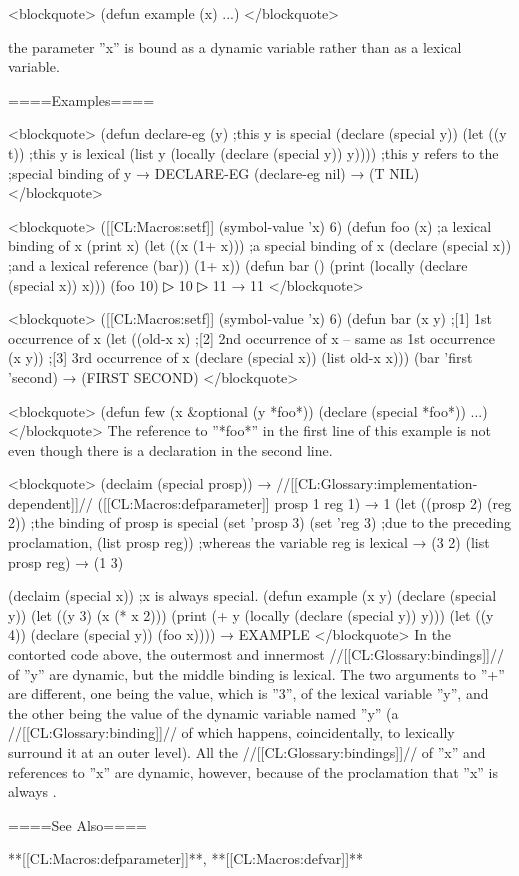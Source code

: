 <blockquote> (defun example (x) ...) </blockquote>

the parameter ''x'' is bound as a dynamic variable rather than as a lexical variable.

====Examples====

<blockquote> (defun declare-eg (y) ;this y is special (declare (special y)) (let ((y t)) ;this y is lexical (list y (locally (declare (special y)) y)))) ;this y refers to the ;special binding of y → DECLARE-EG (declare-eg nil) → (T NIL) </blockquote>

<blockquote> ([[CL:Macros:setf]] (symbol-value 'x) 6) (defun foo (x) ;a lexical binding of x (print x) (let ((x (1+ x))) ;a special binding of x (declare (special x)) ;and a lexical reference (bar)) (1+ x)) (defun bar () (print (locally (declare (special x)) x))) (foo 10)
▷ 10
▷ 11 → 11 </blockquote>

<blockquote> ([[CL:Macros:setf]] (symbol-value 'x) 6) (defun bar (x y) ;[1] 1st occurrence of x (let ((old-x x) ;[2] 2nd occurrence of x -- same as 1st occurrence (x y)) ;[3] 3rd occurrence of x (declare (special x)) (list old-x x))) (bar 'first 'second) → (FIRST SECOND) </blockquote>

<blockquote> (defun few (x &optional (y *foo*)) (declare (special *foo*)) ...) </blockquote> The reference to ''*foo*'' in the first line of this example is not  even though there is a  declaration in the second line.

<blockquote> (declaim (special prosp)) → //[[CL:Glossary:implementation-dependent]]// ([[CL:Macros:defparameter]] prosp 1 reg 1) → 1 (let ((prosp 2) (reg 2)) ;the binding of prosp is special (set 'prosp 3) (set 'reg 3) ;due to the preceding proclamation, (list prosp reg)) ;whereas the variable reg is lexical → (3 2) (list prosp reg) → (1 3)

(declaim (special x)) ;x is always special. (defun example (x y) (declare (special y)) (let ((y 3) (x (* x 2))) (print (+ y (locally (declare (special y)) y))) (let ((y 4)) (declare (special y)) (foo x)))) → EXAMPLE </blockquote> In the contorted code above, the outermost and innermost //[[CL:Glossary:bindings]]// of ''y'' are dynamic, but the middle binding is lexical. The two arguments to ''+'' are different, one being the value, which is ''3'', of the lexical variable ''y'', and the other being the value of the dynamic variable named ''y'' (a //[[CL:Glossary:binding]]// of which happens, coincidentally, to lexically surround it at an outer level). All the //[[CL:Glossary:bindings]]// of ''x'' and references to ''x'' are dynamic, however, because of the proclamation that ''x'' is always .

====See Also====

**[[CL:Macros:defparameter]]**, **[[CL:Macros:defvar]]**

